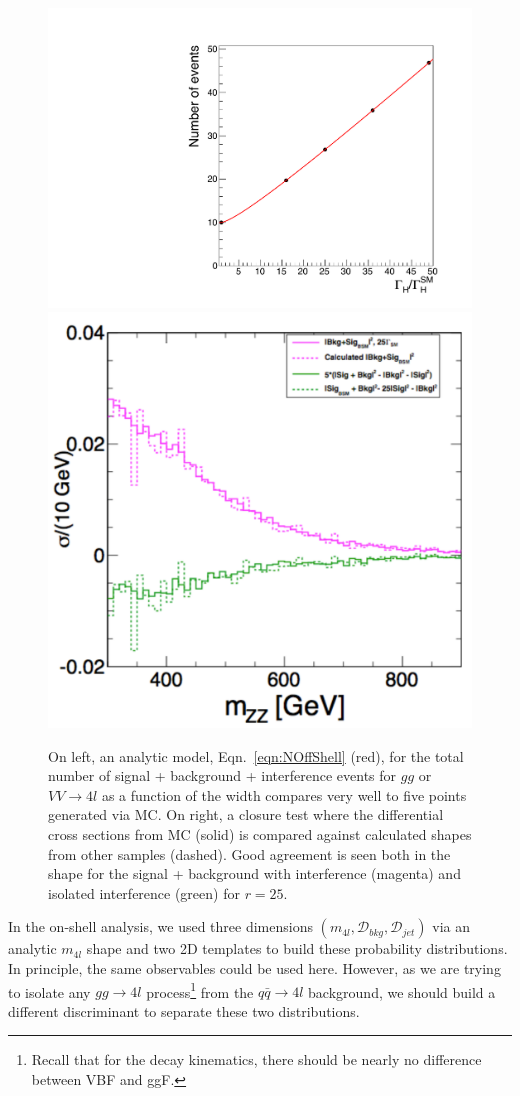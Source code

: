 \begin{figure}[htbp]
\begin{center}
\includegraphics[width=.45\linewidth]{HiggsProperties/figures/yield.pdf}
\includegraphics[width=.45\linewidth]{HiggsProperties/figures/closuretestNHetNI.pdf}
\caption[Modeling of Off-Shell Normalizations in $4l$]{On left, an analytic model, Eqn.~\ref{eqn:NOffShell} (red), for the total number of signal + background + interference events for $gg$ or $VV\rightarrow 4l$ as a function of the width compares very well to five points generated via MC. On right, a closure test where the differential cross sections from MC (solid) is compared against calculated shapes from other samples (dashed). Good agreement is seen both in the shape for the signal + background with interference (magenta) and isolated interference (green) for $r=25$.}
\label{fig:NOffShell}
\end{center}
\end{figure}

In the on-shell analysis, we used three dimensions $(m_{4l},\mathcal{D}_{bkg},\mathcal{D}_{jet})$ via an analytic $m_{4l}$ shape and two 2D templates to build these probability distributions. In principle, the same observables could be used here. However, as we are trying to isolate any $gg\rightarrow 4l$ process\footnote{Recall that for the decay kinematics, there should be nearly no difference between VBF and ggF.} from the $q\bar{q}\rightarrow 4l$ background, we should build a different discriminant to separate these two distributions.  

